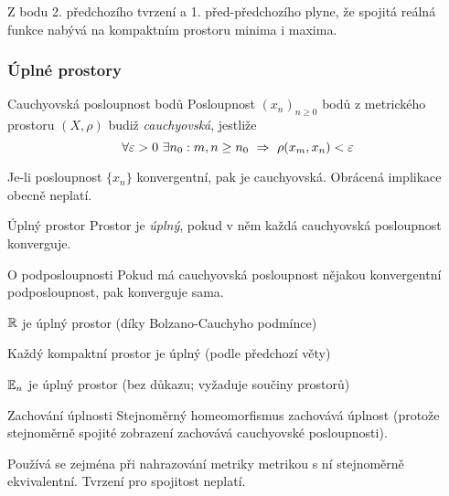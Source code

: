 \begin{dusledek}
Z bodu 2. předchozího tvrzení a 1. před-předchozího plyne, že spojitá reálná funkce nabývá na kompaktním prostoru minima i maxima.
\end{dusledek}


\subsubsection*{Úplné prostory}

\begin{definiceN}{Cauchyovská posloupnost bodů}
Posloupnost $(x_n)_{n\geq 0}$ bodů z metrického prostoru $(X,\rho)$ budiž \emph{cauchyovská}, jestliže
$$\forall\varepsilon>0\ \exists n_0: m,n\geq n_0\ \Rightarrow\  \rho(x_m,x_n)<\varepsilon$$
\end{definiceN}

\begin{poznamka}
Je-li posloupnost $\{x_n\}$ konvergentní, pak je cauchyovská. Obrácená implikace obecně neplatí.
\end{poznamka}

\begin{definiceN}{Úplný prostor}
Prostor je \emph{úplný}, pokud v něm každá cauchyovská posloupnost konverguje.
\end{definiceN}

\begin{vetaN}{O podposloupnosti}
Pokud má cauchyovská posloupnost nějakou konvergentní podposloupnost, pak konverguje sama.
\end{vetaN}

\begin{priklady}
\begin{pitemize}
    \item $\mathbb{R}$ je úplný prostor (díky Bolzano-Cauchyho podmínce)
    \item Každý kompaktní prostor je úplný (podle předchozí věty)
    \item $\mathbb{E}_n$ je úplný prostor (bez důkazu; vyžaduje součiny prostorů)
\end{pitemize}
\end{priklady}

\begin{vetaN}{Zachování úplnosti}
Stejnoměrný homeomorfismus zachovává úplnost (protože stejnoměrně spojité zobrazení zachovává cauchyovské posloupnosti).

\begin{poznamka}
Používá se zejména při nahrazování metriky metrikou s ní stejnoměrně ekvivalentní. Tvrzení pro  spojitost neplatí.
\end{poznamka}
\end{vetaN}

